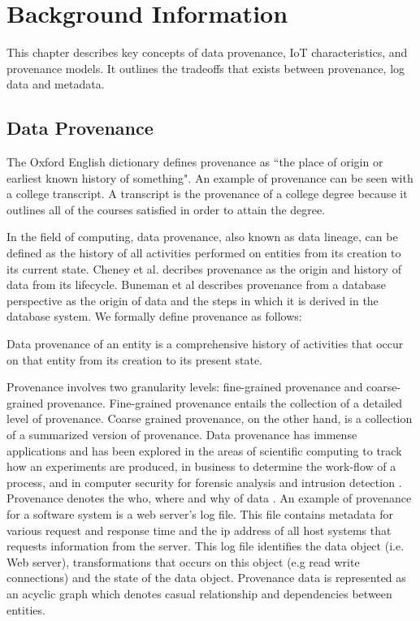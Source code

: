 \chapter{Background Information}

This chapter describes key concepts of data provenance, IoT characteristics, and provenance models. It outlines the tradeoffs that exists between provenance, log data and metadata. 

\section{Data Provenance}
The Oxford English dictionary defines provenance \cite{TCDP1999} as ``the place of origin or earliest known history of something". An example of provenance can be seen with a college transcript. A transcript is the provenance of a college degree because it outlines all of the courses satisfied in order to attain the degree.
\par In the field of computing, data provenance, also known as  data lineage, can be defined as the history of all activities performed on entities from its creation to its current state. Cheney et al. \cite{cheney_provenance_2009} decribes provenance as the origin and history of data from its lifecycle. Buneman et al \cite{buneman_why_2001} describes provenance from a database perspective as the origin of data and the steps in which it is derived in the database system. We formally define provenance as follows:


\begin{definition}

Data provenance of an entity is a comprehensive history of activities that occur on that entity from its creation to its present state.

\end{definition}

Provenance involves two granularity levels: fine-grained provenance and coarse-grained provenance. Fine-grained provenance \cite{glavic_case_2011} entails the collection of a detailed level of provenance. Coarse grained provenance, on the other hand, is a collection of a summarized version of provenance. Data provenance has immense applications and has been explored in the areas of scientific computing \cite{groth, altintas} to track how an experiments are produced, in business to determine the work-flow of  a process, and in computer security for forensic analysis and intrusion detection \cite{bates_towards_2013, muniswamy_reddy_provenance_2010, muniswamy_reddy} . Provenance denotes the who, where and why of data \cite{cheney_provenance_2009}. An example of provenance for a software system is a web server's log file. This file contains metadata for various request and response time and the ip address of all host systems that requests information from the server. This log file identifies the data object (i.e. Web server), transformations that occurs on this object (e.g read write connections) and the state of the data object. Provenance data is represented as an acyclic graph which denotes casual relationship and dependencies between entities. 

